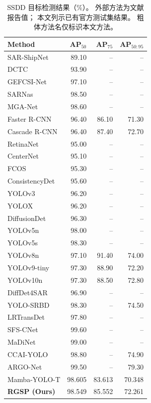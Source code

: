 \documentclass[journal]{IEEEtran}
\begin{document}
\begin{table}[!t]
\centering
\small
\setlength{\tabcolsep}{5pt}
\caption{SSDD 目标检测结果（\%）。
外部方法为文献报告值；
本文列示已有官方测试集结果。
粗体方法名仅标识本文方法。}
\label{tab:ssdd_comparison}
\begin{tabular*}{\textwidth}{@{\extracolsep{\fill}}lrrr}
\toprule
Method & AP$_{50}$ & AP$_{75}$ & AP$_{50:95}$ \\
\midrule
SAR-ShipNet       & 89.10 & --    & --    \\
DCTC              & 93.90 & --    & --    \\
GEFCSI-Net        & 97.10 & --    & --    \\
SARNas            & 98.50 & --    & --    \\
MGA-Net           & 98.60 & --    & --    \\
Faster R-CNN      & 96.40 & 86.10 & 71.30 \\
Cascade R-CNN     & 96.40 & 87.40 & 72.70 \\
RetinaNet         & 95.00 & --    & --    \\
CenterNet         & 95.10 & --    & --    \\
FCOS              & 95.30 & --    & --    \\
ConsistencyDet    & 95.60 & --    & --    \\
YOLOv3            & 96.20 & --    & --    \\
YOLOX             & 96.20 & --    & --    \\
DiffusionDet      & 96.30 & --    & --    \\
YOLOv5n           & 98.00 & --    & --    \\
YOLOv5s           & 98.30 & --    & --    \\
YOLOv8n           & 97.10 & 91.40 & 74.00 \\
YOLOv9-tiny       & 97.30 & 88.90 & 72.20 \\
YOLOv10n          & 97.30 & 88.50 & 72.80 \\
DiffDet4SAR       & 96.90 & --    & --    \\
YOLO-SRBD         & 98.30 & --    & 74.50 \\
LRTransDet        & 97.80 & --    & --    \\
SFS-CNet          & 99.60 & --    & --    \\
MaDiNet           & 99.00 & --    & --    \\
CCAI-YOLO         & 98.80 & --    & 74.90 \\
ARGO-Net          & 99.50 & --    & 79.30 \\
\midrule
Mamba-YOLO-T      & 98.605 & 83.613 & 70.348 \\
\textbf{RGSP (Ours)}
                  & 98.549 & 85.552 & 72.261 \\
\bottomrule
\end{tabular*}


\end{table}
\end{document}
